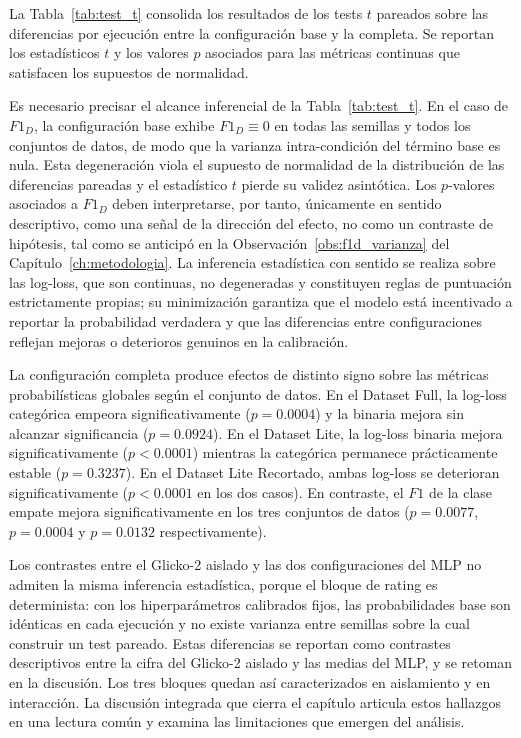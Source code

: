 La Tabla~\ref{tab:test_t} consolida los resultados de los tests $t$ pareados sobre las diferencias por ejecuci\'on entre la configuraci\'on base y la completa. Se reportan los estad\'isticos $t$ y los valores $p$ asociados para las m\'etricas continuas que satisfacen los supuestos de normalidad.



Es necesario precisar el alcance inferencial de la Tabla~\ref{tab:test_t}. En el caso de $F1_D$, la configuraci\'on base exhibe $F1_D \equiv 0$ en todas las semillas y todos los conjuntos de datos, de modo que la varianza intra-condici\'on del t\'ermino base es nula. Esta degeneraci\'on viola el supuesto de normalidad de la distribuci\'on de las diferencias pareadas y el estad\'istico $t$ pierde su validez asint\'otica. Los $p$-valores asociados a $F1_D$ deben interpretarse, por tanto, \'unicamente en sentido descriptivo, como una se\~nal de la direcci\'on del efecto, no como un contraste de hip\'otesis, tal como se anticip\'o en la Observaci\'on~\ref{obs:f1d_varianza} del Cap\'itulo~\ref{ch:metodologia}. La inferencia estad\'istica con sentido se realiza sobre las log-loss, que son continuas, no degeneradas y constituyen reglas de puntuaci\'on estrictamente propias; su minimizaci\'on garantiza que el modelo est\'a incentivado a reportar la probabilidad verdadera y que las diferencias entre configuraciones reflejan mejoras o deterioros genuinos en la calibraci\'on.

La configuraci\'on completa produce efectos de distinto signo sobre las m\'etricas probabil\'isticas globales seg\'un el conjunto de datos. En el Dataset Full, la log-loss categ\'orica empeora significativamente ($p=0{.}0004$) y la binaria mejora sin alcanzar significancia ($p=0{.}0924$). En el Dataset Lite, la log-loss binaria mejora significativamente ($p<0{.}0001$) mientras la categ\'orica permanece pr\'acticamente estable ($p=0{.}3237$). En el Dataset Lite Recortado, ambas log-loss se deterioran significativamente ($p<0{.}0001$ en los dos casos). En contraste, el $F1$ de la clase empate mejora significativamente en los tres conjuntos de datos ($p=0{.}0077$, $p=0{.}0004$ y $p=0{.}0132$ respectivamente).

Los contrastes entre el Glicko-2 aislado y las dos configuraciones del MLP no admiten la misma inferencia estad\'istica, porque el bloque de rating es determinista: con los hiperpar\'ametros calibrados fijos, las probabilidades base son id\'enticas en cada ejecuci\'on y no existe varianza entre semillas sobre la cual construir un test pareado. Estas diferencias se reportan como contrastes descriptivos entre la cifra del Glicko-2 aislado y las medias del MLP, y se retoman en la discusi\'on. Los tres bloques quedan as\'i caracterizados en aislamiento y en interacci\'on. La discusi\'on integrada que cierra el cap\'itulo articula estos hallazgos en una lectura com\'un y examina las limitaciones que emergen del an\'alisis.

